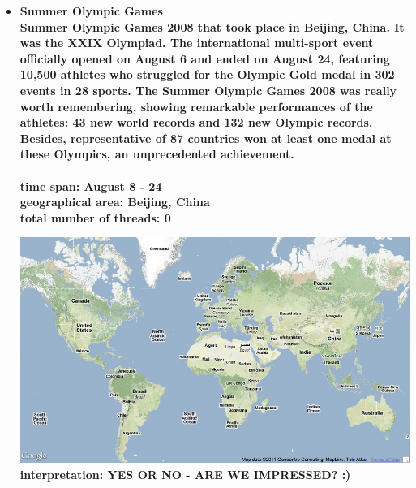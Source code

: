 \documentclass[11pt,a4paper,english]{article}
\begin{document}
\begin{itemize}
					\item \bf Summer Olympic Games \rm
						\\ Summer Olympic Games 2008 that took place in Beijing, China. It was the XXIX Olympiad. The international multi-sport event officially opened on August 6 and ended on August 24, featuring 10,500 athletes who struggled for the Olympic Gold medal in 302 events in 28 sports. The Summer Olympic Games 2008 was really worth remembering, showing remarkable performances of the athletes: 43 new world records and 132 new Olympic records. Besides, representative of 87 countries won at least one medal at these Olympics, an unprecedented achievement.
						\\\\ \bf time span: \rm August 8 - 24
						\\ \bf geographical area: \rm Beijing, China
						\\ \bf total number of threads: \rm 0
					
						\includegraphics[width=130mm]{img/2005-1}
						\bf interpretation: \rm YES OR NO - ARE WE IMPRESSED? :)
						
						
						
				\end{itemize}
			
\end{document}
